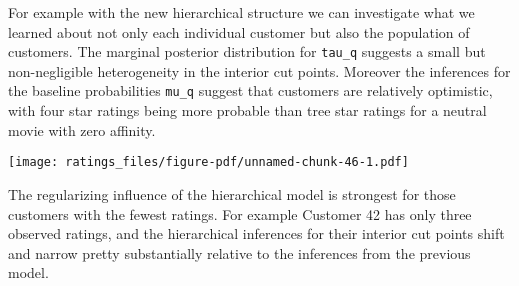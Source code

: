\documentclass[
  letterpaper,
  DIV=11,
  numbers=noendperiod]{scrartcl}
\newenvironment{Shaded}{\begin{snugshade}}{\end{snugshade}}
\newcommand{\AttributeTok}[1]{\textcolor[rgb]{0.40,0.45,0.13}{#1}}
\newcommand{\ControlFlowTok}[1]{\textcolor[rgb]{0.00,0.23,0.31}{#1}}
\newcommand{\DecValTok}[1]{\textcolor[rgb]{0.68,0.00,0.00}{#1}}
\newcommand{\FloatTok}[1]{\textcolor[rgb]{0.68,0.00,0.00}{#1}}
\newcommand{\FunctionTok}[1]{\textcolor[rgb]{0.28,0.35,0.67}{#1}}
\newcommand{\NormalTok}[1]{\textcolor[rgb]{0.00,0.23,0.31}{#1}}
\newcommand{\OtherTok}[1]{\textcolor[rgb]{0.00,0.23,0.31}{#1}}
\newcommand{\SpecialCharTok}[1]{\textcolor[rgb]{0.37,0.37,0.37}{#1}}
\newcommand{\StringTok}[1]{\textcolor[rgb]{0.13,0.47,0.30}{#1}}
\begin{document}
For example with the new hierarchical structure we can investigate what
we learned about not only each individual customer but also the
population of customers. The marginal posterior distribution for
\texttt{tau\_q} suggests a small but non-negligible heterogeneity in the
interior cut points. Moreover the inferences for the baseline
probabilities \texttt{mu\_q} suggest that customers are relatively
optimistic, with four star ratings being more probable than tree star
ratings for a neutral movie with zero affinity.

\begin{Shaded}
\end{Shaded}

\texttt{[image: ratings\_files/figure-pdf/unnamed-chunk-46-1.pdf]}

The regularizing influence of the hierarchical model is strongest for
those customers with the fewest ratings. For example Customer 42 has
only three observed ratings, and the hierarchical inferences for their
interior cut points shift and narrow pretty substantially relative to
the inferences from the previous model.
\end{document}
